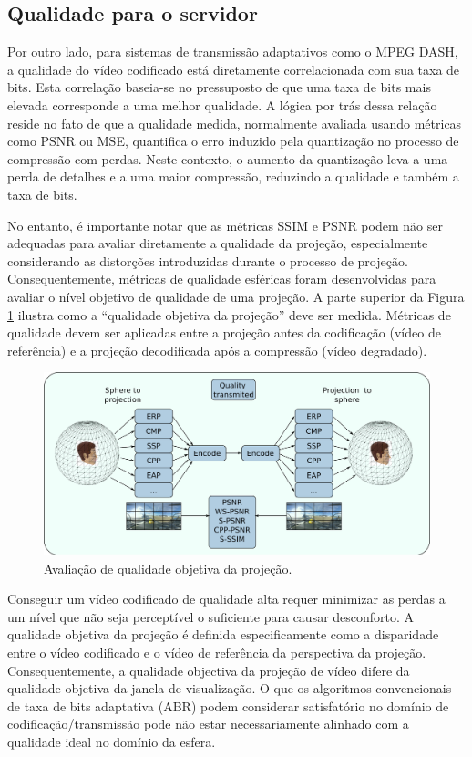 {\subsection{Qualidade para o servidor}

Por outro lado, para sistemas de transmissão adaptativos como o MPEG DASH, a qualidade do vídeo codificado está diretamente correlacionada com sua taxa de bits. Esta correlação baseia-se no pressuposto de que uma taxa de bits mais elevada corresponde a uma melhor qualidade. A lógica por trás dessa relação reside no fato de que a qualidade medida, normalmente avaliada usando métricas como PSNR ou MSE, quantifica o erro induzido pela quantização no processo de compressão com perdas. Neste contexto, o aumento da quantização leva a uma perda de detalhes e a uma maior compressão, reduzindo a qualidade e também a taxa de bits.

No entanto, é importante notar que as métricas SSIM e PSNR podem não ser adequadas para avaliar diretamente a qualidade da projeção, especialmente considerando as distorções introduzidas durante o processo de projeção. Consequentemente, métricas de qualidade esféricas foram desenvolvidas para avaliar o nível objetivo de qualidade de uma projeção. A parte superior da Figura \ref{fig:QualityDiagram} ilustra como a “qualidade objetiva da projeção” deve ser medida. Métricas de qualidade devem ser aplicadas entre a projeção antes da codificação (vídeo de referência) e a projeção decodificada após a compressão (vídeo degradado).

\begin{figure}[htb]
        \centering
        \includegraphics[width=0.7\linewidth]{fig/diagrama e qualidade 1.png}
        \caption{Avaliação de qualidade objetiva da projeção.}
        \label{fig:QualityDiagram}
\end{figure}

Conseguir um vídeo codificado de qualidade alta requer minimizar as perdas a um nível que não seja perceptível o suficiente para causar desconforto. A qualidade objetiva da projeção é definida especificamente como a disparidade entre o vídeo codificado e o vídeo de referência da perspectiva da projeção. Consequentemente, a qualidade objectiva da projeção de vídeo difere da qualidade objetiva da janela de visualização. O que os algoritmos convencionais de taxa de bits adaptativa (ABR) podem considerar satisfatório no domínio de codificação/transmissão pode não estar necessariamente alinhado com a qualidade ideal no domínio da esfera.

}
